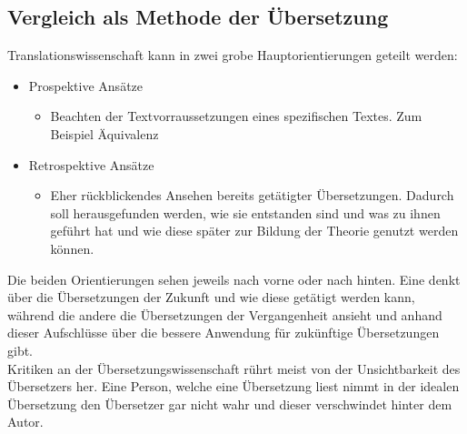 \documentclass{article}
\begin{document}
	\subsection{Vergleich als Methode der Übersetzung}
	Translationswissenschaft kann in zwei grobe Hauptorientierungen geteilt werden:
	\begin{itemize}
		\item{Prospektive Ansätze}
		\begin{itemize}
			\item{Beachten der Textvorraussetzungen eines spezifischen Textes. Zum Beispiel Äquivalenz}
		\end{itemize}
		\item{Retrospektive Ansätze}
		\begin{itemize}
			\item{Eher rückblickendes Ansehen bereits getätigter Übersetzungen. Dadurch soll herausgefunden werden, wie sie entstanden sind und was zu ihnen geführt hat und wie diese später zur Bildung der Theorie genutzt werden können.}
		\end{itemize}
	\end{itemize}
	Die beiden Orientierungen sehen jeweils nach vorne oder nach hinten. Eine denkt über die Übersetzungen der Zukunft und wie diese getätigt werden kann, während die andere die Übersetzungen der Vergangenheit ansieht und anhand dieser Aufschlüsse über die bessere Anwendung für zukünftige Übersetzungen gibt. \\
	Kritiken an der Übersetzungswissenschaft rührt meist von der Unsichtbarkeit des Übersetzers her. Eine Person, welche eine Übersetzung liest nimmt in der idealen Übersetzung den Übersetzer gar nicht wahr und dieser verschwindet hinter dem Autor. \\
\end{document}
